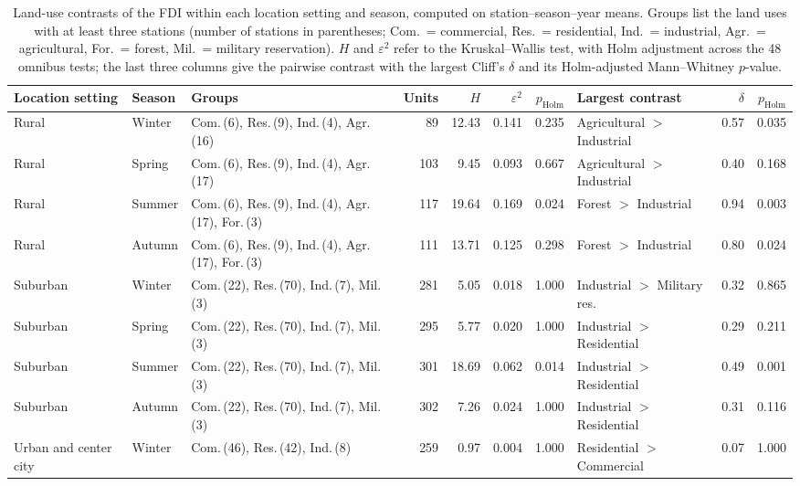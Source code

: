 \documentclass[a4paper,fleqn]{cas-sc}
\begin{document}
\begin{table}[!htbp]
\centering
\scriptsize
\caption{Land-use contrasts of the FDI within each location setting and season, computed on station--season--year means. Groups list the land uses with at least three stations (number of stations in parentheses; Com.\ = commercial, Res.\ = residential, Ind.\ = industrial, Agr.\ = agricultural, For.\ = forest, Mil.\ = military reservation). $H$ and $\varepsilon^2$ refer to the Kruskal--Wallis test, with Holm adjustment across the 48 omnibus tests; the last three columns give the pairwise contrast with the largest Cliff's $\delta$ and its Holm-adjusted Mann--Whitney $p$-value.}
\label{tab:fdi_contrasts}
\setlength{\tabcolsep}{3pt}
\begin{tabular}{ll>{\raggedright\arraybackslash}p{3.7cm}rrrrlrr}
\toprule
\textbf{Location setting} & \textbf{Season} & \textbf{Groups} & \textbf{Units} & \textbf{$H$} & \textbf{$\varepsilon^2$} & \textbf{$p_{\mathrm{Holm}}$} & \textbf{Largest contrast} & \textbf{$\delta$} & \textbf{$p_{\mathrm{Holm}}$} \\
\midrule
Rural & Winter & Com.\,(6), Res.\,(9), Ind.\,(4), Agr.\,(16) & 89 & 12.43 & 0.141 & 0.235 & Agricultural $>$ Industrial & 0.57 & 0.035 \\
Rural & Spring & Com.\,(6), Res.\,(9), Ind.\,(4), Agr.\,(17) & 103 & 9.45 & 0.093 & 0.667 & Agricultural $>$ Industrial & 0.40 & 0.168 \\
Rural & Summer & Com.\,(6), Res.\,(9), Ind.\,(4), Agr.\,(17), For.\,(3) & 117 & 19.64 & 0.169 & 0.024 & Forest $>$ Industrial & 0.94 & 0.003 \\
Rural & Autumn & Com.\,(6), Res.\,(9), Ind.\,(4), Agr.\,(17), For.\,(3) & 111 & 13.71 & 0.125 & 0.298 & Forest $>$ Industrial & 0.80 & 0.024 \\
Suburban & Winter & Com.\,(22), Res.\,(70), Ind.\,(7), Mil.\,(3) & 281 & 5.05 & 0.018 & 1.000 & Industrial $>$ Military res. & 0.32 & 0.865 \\
Suburban & Spring & Com.\,(22), Res.\,(70), Ind.\,(7), Mil.\,(3) & 295 & 5.77 & 0.020 & 1.000 & Industrial $>$ Residential & 0.29 & 0.211 \\
Suburban & Summer & Com.\,(22), Res.\,(70), Ind.\,(7), Mil.\,(3) & 301 & 18.69 & 0.062 & 0.014 & Industrial $>$ Residential & 0.49 & 0.001 \\
Suburban & Autumn & Com.\,(22), Res.\,(70), Ind.\,(7), Mil.\,(3) & 302 & 7.26 & 0.024 & 1.000 & Industrial $>$ Residential & 0.31 & 0.116 \\
Urban and center city & Winter & Com.\,(46), Res.\,(42), Ind.\,(8) & 259 & 0.97 & 0.004 & 1.000 & Residential $>$ Commercial & 0.07 & 1.000 \\

\end{tabular}
\end{table}
\end{document}
